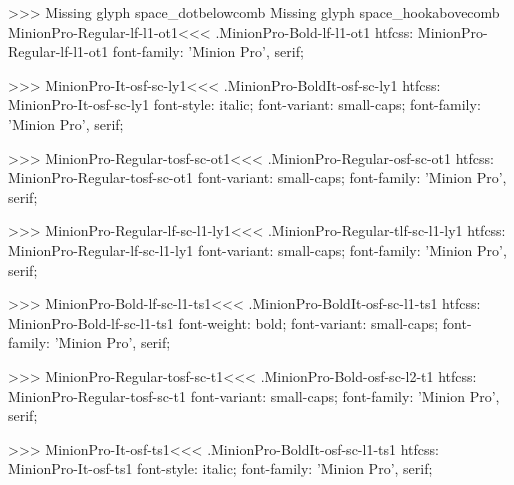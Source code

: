 {>>>
Missing glyph	space_dotbelowcomb
Missing glyph	space_hookabovecomb
\<MinionPro-Regular-lf-l1-ot1\><<<
.MinionPro-Bold-lf-l1-ot1
htfcss:  MinionPro-Regular-lf-l1-ot1  font-family: 'Minion Pro', serif;

>>>
\<MinionPro-It-osf-sc-ly1\><<<
.MinionPro-BoldIt-osf-sc-ly1
htfcss:  MinionPro-It-osf-sc-ly1  font-style: italic; font-variant: small-caps; font-family: 'Minion Pro', serif;

>>>
\<MinionPro-Regular-tosf-sc-ot1\><<<
.MinionPro-Regular-osf-sc-ot1
htfcss:  MinionPro-Regular-tosf-sc-ot1  font-variant: small-caps; font-family: 'Minion Pro', serif;

>>>
\<MinionPro-Regular-lf-sc-l1-ly1\><<<
.MinionPro-Regular-tlf-sc-l1-ly1
htfcss:  MinionPro-Regular-lf-sc-l1-ly1  font-variant: small-caps; font-family: 'Minion Pro', serif;

>>>
\<MinionPro-Bold-lf-sc-l1-ts1\><<<
.MinionPro-BoldIt-osf-sc-l1-ts1
htfcss:  MinionPro-Bold-lf-sc-l1-ts1  font-weight: bold; font-variant: small-caps; font-family: 'Minion Pro', serif;

>>>
\<MinionPro-Regular-tosf-sc-t1\><<<
.MinionPro-Bold-osf-sc-l2-t1
htfcss:  MinionPro-Regular-tosf-sc-t1  font-variant: small-caps; font-family: 'Minion Pro', serif;

>>>
\<MinionPro-It-osf-ts1\><<<
.MinionPro-BoldIt-osf-sc-l1-ts1
htfcss:  MinionPro-It-osf-ts1  font-style: italic; font-family: 'Minion Pro', serif;

}
